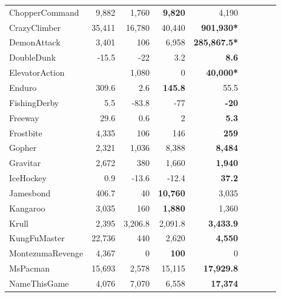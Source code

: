 {\begin{tabular}{lrrrrrrrl}
ChopperCommand   & 9,882                & 1,760          & \textbf{9,820}  & 4,190              \\
CrazyClimber     & 35,411               & 16,780         & 40,440          & \textbf{901,930*}   \\
DemonAttack      & 3,401                & 106            & 6,958           & \textbf{285,867.5*}   \\
DoubleDunk       & -15.5                   & -22            & 3.2               & \textbf{8.6}         \\
ElevatorAction   & \multicolumn{1}{l}{} & 1,080          & 0               & \textbf{40,000*}    \\
Enduro           & 309.6                   & 2.6              & \textbf{145.8}    & 55.5                 \\
FishingDerby     & 5.5                     & -83.8            & -77             & \textbf{-20}       \\
Freeway          & 29.6                    & 0.6              & 2               & \textbf{5.3}         \\
Frostbite        & 4,335                & 106            & 146             & \textbf{259}       \\
Gopher           & 2,321                & 1,036          & 8,388           & \textbf{8,484}     \\
Gravitar         & 2,672                & 380            & 1,660           & \textbf{1,940}     \\
IceHockey        & 0.9                     & -13.6            & -12.4             & \textbf{37.2}        \\
Jamesbond        & 406.7                   & 40             & \textbf{10,760} & 3,035              \\
Kangaroo         & 3,035                & 160            & \textbf{1,880}  & 1,360              \\
Krull            & 2,395                & 3,206.8          & 2,091.8           & \textbf{3,433.9}     \\
KungFuMaster     & 22,736               & 440            & 2,620           & \textbf{4,550}     \\
MontezumaRevenge & 4,367                & 0              & \textbf{100}    & 0                  \\
MsPacman         & 15,693               & 2,578          & 15,115          & \textbf{17,929.8}    \\
NameThisGame     & 4,076                & 7,070          & 6,558           & \textbf{17,374}    \\

\end{tabular}}
